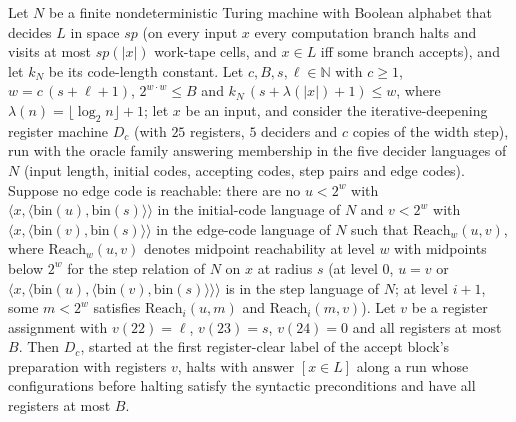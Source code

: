 \begin{theorem}
\label{Complexity.LogProg.SavitchARM.dp_acc}
\leanok
{}
Let $N$ be a finite nondeterministic Turing machine with Boolean alphabet that decides $L$ in space $\mathit{sp}$ (on every input $x$ every computation branch halts and visits at most $\mathit{sp}(|x|)$ work-tape cells, and $x\in L$ iff some branch accepts), and let
$k_N$ be its code-length constant. Let $c,B,s,\ell\in\mathbb{N}$ with $c\ge1$, $w=c\,(s+\ell+1)$,
$2^{w\cdot w}\le B$ and $k_N\,(s+\lambda(|x|)+1)\le w$, where $\lambda(n)=\lfloor\log_2
n\rfloor+1$; let $x$ be an input, and consider the iterative-deepening register machine $D_c$ (with $25$ registers, $5$ deciders and $c$ copies of the width step), run with the oracle family answering membership in the five decider languages of $N$ (input length, initial codes, accepting codes, step pairs and edge codes). Suppose no edge code is
reachable: there are no $u<2^w$ with $\langle x,\langle\mathrm{bin}(u),\mathrm{bin}(s)\rangle
\rangle$ in the initial-code language of $N$ and $v<2^w$ with $\langle x,\langle\mathrm{bin}(v),
\mathrm{bin}(s)\rangle\rangle$ in the edge-code language of $N$ such that $\mathrm{Reach}_w(u,v)$,
where $\mathrm{Reach}_w(u,v)$ denotes midpoint reachability at level $w$ with midpoints below $2^w$ for the step relation of $N$ on $x$ at radius $s$ (at level $0$, $u=v$ or $\langle x,\langle \mathrm{bin}(u),\langle \mathrm{bin}(v),\mathrm{bin}(s)\rangle\rangle\rangle$ is in the step language of $N$; at level $i+1$, some $m<2^w$ satisfies $\mathrm{Reach}_i(u,m)$ and $\mathrm{Reach}_i(m,v)$). Let $v$ be a register assignment with $v(22)=\ell$, $v(23)=s$, $v(24)=0$ and all
registers at most $B$. Then $D_c$, started at the first register-clear label of the accept block's
preparation with registers $v$, halts with answer $[x\in L]$ along a run whose configurations before
halting satisfy the syntactic preconditions and have all registers at most $B$.
\end{theorem}

